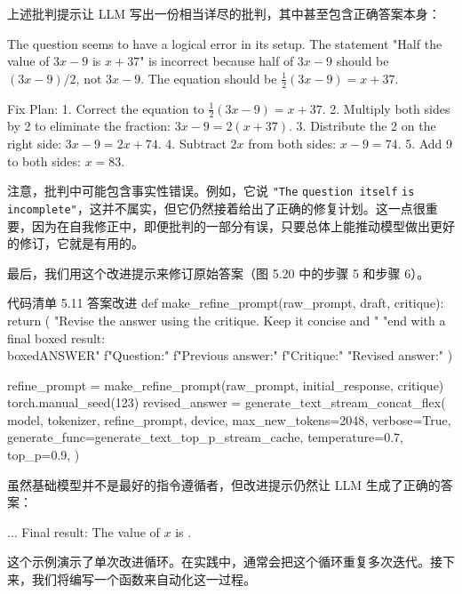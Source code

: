上述批判提示让 LLM 写出一份相当详尽的批判，其中甚至包含正确答案本身：

\begin{codebox}
 The question seems to have a logical error in its setup. The statement "Half the value of $3x-9$ is $x+37$" is incorrect because half of $3x-9$ should be $(3x-9)/2$, not $3x-9$. The equation should be $\frac{1}{2}(3x-9) = x + 37$.

Fix Plan:
1. Correct the equation to $\frac{1}{2}(3x-9) = x + 37$.
2. Multiply both sides by 2 to eliminate the fraction: $3x - 9 = 2(x + 37)$.
3. Distribute the 2 on the right side: $3x - 9 = 2x + 74$.
4. Subtract $2x$ from both sides: $x - 9 = 74$.
5. Add 9 to both sides: $x = 83$.
\end{codebox}

注意，批判中可能包含事实性错误。例如，它说 \texttt{"}\texttt{The} \texttt{question itself} \texttt{is} \texttt{incomplete}\texttt{"}，这并不属实，但它仍然接着给出了正确的修复计划。这一点很重要，因为在自我修正中，即便批判的一部分有误，只要总体上能推动模型做出更好的修订，它就是有用的。

最后，我们用这个改进提示来修订原始答案（图 5.20 中的步骤 5 和步骤 6）。

\begin{codeboxt}{代码清单 5.11 答案改进}
def make_refine_prompt(raw_prompt, draft, critique):
    return (
        "Revise the answer using the critique. Keep it concise and "
        "end with a final boxed result: \\boxed{ANSWER}\n\n"
        f"Question:\n\n"
        f"Previous answer:\n\n"
        f"Critique:\n\n"
        "Revised answer:"
    )

refine_prompt = make_refine_prompt(raw_prompt, initial_response, critique)
torch.manual_seed(123)
revised_answer = generate_text_stream_concat_flex(
    model, tokenizer, refine_prompt, device,
    max_new_tokens=2048, verbose=True,
    generate_func=generate_text_top_p_stream_cache,
    temperature=0.7,
    top_p=0.9,
)
\end{codeboxt}

虽然基础模型并不是最好的指令遵循者，但改进提示仍然让 LLM 生成了正确的答案：

\begin{codebox}
...
Final result: The value of $x$ is .
\end{codebox}

这个示例演示了单次改进循环。在实践中，通常会把这个循环重复多次迭代。接下来，我们将编写一个函数来自动化这一过程。


